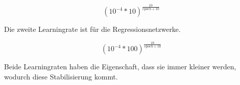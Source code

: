 \begin{equation}
    (10^{-4} * 10)^{\frac{10}{epoch + 10}}
\end{equation}

Die zweite Learningrate ist für die Regressionsnetzwerke. 

\begin{equation}
    (10^{-4} * 100)^{\frac{10}{epoch + 10}}
\end{equation}

Beide Learningraten haben die Eigenschaft, dass sie immer kleiner werden, wodurch diese Stabilisierung kommt. 



